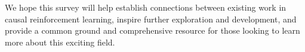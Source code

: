 \documentclass[10pt]{article} %
\theoremstyle{definition}
\begin{document}
We hope this survey will help establish connections between existing work in causal reinforcement learning, inspire further exploration and development, and provide a common ground and comprehensive resource for those looking to learn more about this exciting field.









\end{document}
